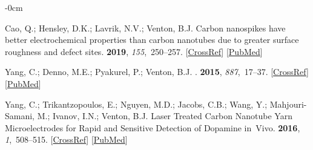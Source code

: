 \documentclass[molecules,article,accept,pdftex,moreauthors]{Definitions/mdpi}
\begin{document}
\begin{adjustwidth}{-\extralength}{0cm}


% 




%

\begin{thebibliography}{999}

Cao, Q.; Hensley, D.K.; Lavrik, N.V.; Venton, B.J.
\newblock Carbon nanospikes have better electrochemical properties than carbon
nanotubes due to greater surface roughness and defect sites.
 {\bf 2019}, {\em 155},~250--257. [\href{http://doi.org/10.1016/j.carbon.2019.08.064}{CrossRef}] [\href{http://www.ncbi.nlm.nih.gov/pubmed/31588146}{PubMed}]

Yang, C.; Denno, M.E.; Pyakurel, P.; Venton, B.J.
.
 {\bf 2015}, {\em 887},~17--37. [\href{http://dx.doi.org/10.1016/j.aca.2015.05.049}{CrossRef}] [\href{http://www.ncbi.nlm.nih.gov/pubmed/26320782}{PubMed}]

Yang, C.; Trikantzopoulos, E.; Nguyen, M.D.; Jacobs, C.B.; Wang, Y.;
Mahjouri-Samani, M.; Ivanov, I.N.; Venton, B.J.
\newblock Laser Treated Carbon Nanotube Yarn Microelectrodes for Rapid and
Sensitive Detection of Dopamine in~Vivo.
 {\bf 2016}, {\em 1},~508--515. [\href{http://dx.doi.org/10.1021/acssensors.6b00021}{CrossRef}] [\href{http://www.ncbi.nlm.nih.gov/pubmed/27430021}{PubMed}]


\end{thebibliography}
\end{adjustwidth}
\end{document}
